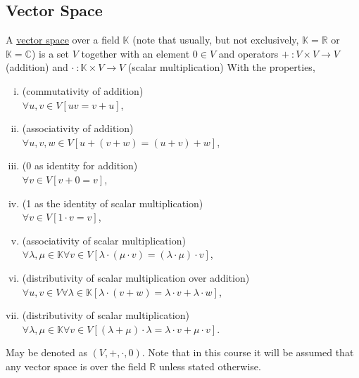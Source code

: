 \subsection{Vector Space}
\udef A \ul{vector space} over a field $\mathbb{K}$
(note that usually, but not exclusively, $\mathbb{K} = \mathbb{R}$ or $\mathbb{K} = \mathbb{C}$)
is a set $V$ together with an element $0 \in V$ and operators $+\ \colon V \times V \to V$
(addition) and $\cdot\ \colon \mathbb{K} \times V \to V$ (scalar multiplication)
With the properties,
\begin{enumerate}[(i)]
    \item (commutativity of addition)\\
        $\forall u,v \in V \left[ u v = v + u \right]$,
    \item (associativity of addition)\\
        $\forall u,v,w \in V \left[ u+(v+w) = (u+v)+w \right]$,
    \item (0 as identity for addition)\\
        $\forall v \in V \left[ v + 0 = v \right]$,
    \item (1 as the identity of scalar multiplication)\\
        $\forall v \in V \left[ 1 \cdot v = v \right]$,
    \item (associativity of scalar multiplication)\\
        $\forall \lambda,\mu \in \mathbb{K} \forall v \in V \left[
            \lambda \cdot (\mu \cdot v) = (\lambda \cdot \mu) \cdot v \right]$,
    \item (distributivity of scalar multiplication over addition)\\
        $\forall u,v \in V \forall \lambda \in \mathbb{K} \left[
        \lambda \cdot (v + w) = \lambda \cdot v + \lambda \cdot w \right]$,
    \item (distributivity of scalar multiplication)\\
        $\forall \lambda, \mu \in \mathbb{K} \forall v \in V \left[
            (\lambda + \mu) \cdot \lambda = \lambda \cdot v + \mu \cdot v \right]$.
\end{enumerate}
May be denoted as $(V, +, \cdot, 0)$.
Note that in this course it will be assumed that any vector space is over the field
$\mathbb{R}$ unless stated otherwise.


